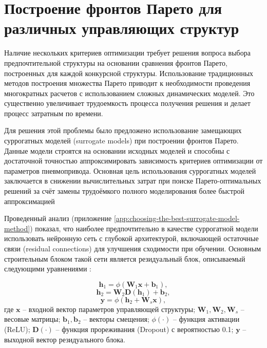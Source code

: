 \section{Построение фронтов Парето для различных управляющих структур}

Наличие нескольких критериев оптимизации требует решения вопроса выбора
предпочтительной структуры на основании сравнения фронтов Парето, построенных
для каждой конкурсной структуры. Использование традиционных методов построения
множества Парето приводит к необходимости проведения многократных расчетов с
использованием сложных динамических моделей. Это существенно увеличивает трудоемкость
процесса получения решения и делает процесс затратным по времени.

Для решения этой проблемы было предложено использование замещающих суррогатных
моделей (surrogate models) \cite{surrogate_model} при построении фронтов Парето.
Данные модели строятся на основании исходных моделей и способны с достаточной
точностью аппроксимировать зависимость критериев оптимизации от параметров
пневмопривода. Основная цель использования суррогатных
моделей заключается в снижении вычислительных затрат при поиске Парето-оптимальных
решений за счёт замены трудоёмкого полного моделирования более быстрой аппроксимацией

Проведенный анализ (приложение \ref{app:choosing-the-best-surrogate-model-method}) показал,
что наиболее предпочтительно в качестве суррогатной модели использовать нейронную сеть с
глубокой архитектурой, включающей остаточные связи (residual connections)
для улучшения сходимости при обучении. Основным строительным
блоком такой сети является резидуальный блок, описываемый следующими уравнениями \cite{he2015deepresiduallearningimage}:

\begin{equation}
	\mathbf{h}_1 = \phi(\mathbf{W}_1 \mathbf{x} + \mathbf{b}_1),
\end{equation}
\begin{equation}
	\mathbf{h}_2 = \mathbf{W}_2 \mathbf{D}(\mathbf{h}_1) + \mathbf{b}_2,
\end{equation}
\begin{equation}
	\mathbf{y} = \phi(\mathbf{h}_2 + \mathbf{W}_s \mathbf{x}),
\end{equation}
где $\mathbf{x}$ -- входной вектор параметров управляющей структуры;
$\mathbf{W}_1, \mathbf{W}_2, \mathbf{W}_s$ -- весовые матрицы;
$\mathbf{b}_1, \mathbf{b}_2$ -- векторы смещения;
$\phi(\cdot)$ -- функция активации (ReLU);
$\mathbf{D}(\cdot)$ -- функция прореживания (Dropout) с вероятностью \num{0.1};
$\mathbf{y}$ -- выходной вектор резидуального блока.


